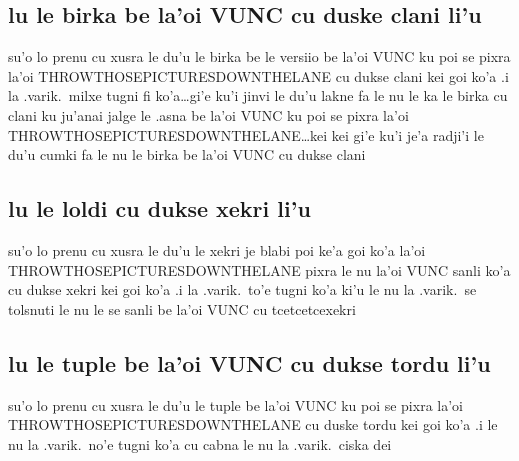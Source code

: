 \documentclass{report}
\begin{document}
\subsection{lu le birka be la'oi VUNC cu duske clani li'u}
su'o lo prenu cu xusra le du'u le birka be le versiio be la'oi VUNC ku poi se pixra la'oi THROWTHOSEPICTURESDOWNTHELANE cu dukse clani kei goi ko'a  .i la .varik.\ milxe tugni fi ko'a\ldots gi'e ku'i jinvi le du'u lakne fa le nu le ka le birka cu clani ku ju'anai jalge le .asna be la'oi VUNC ku poi se pixra la'oi THROWTHOSEPICTURESDOWNTHELANE\ldots kei kei gi'e ku'i je'a radji'i le du'u cumki fa le nu le birka be la'oi VUNC cu dukse clani

\subsection{lu le loldi cu dukse xekri li'u}
su'o lo prenu cu xusra le du'u le xekri je blabi poi ke'a goi ko'a la'oi THROWTHOSEPICTURESDOWNTHELANE pixra le nu la'oi VUNC sanli ko'a cu dukse xekri kei goi ko'a  .i la .varik.\ to'e tugni ko'a ki'u le nu la .varik.\ se tolsnuti le nu le se sanli be la'oi VUNC cu tcetcetcexekri

\subsection{lu le tuple be la'oi VUNC cu dukse tordu li'u}
su'o lo prenu cu xusra le du'u le tuple be la'oi VUNC ku poi se pixra la'oi THROWTHOSEPICTURESDOWNTHELANE cu duske tordu kei goi ko'a  .i le nu la .varik.\ no'e tugni ko'a cu cabna le nu la .varik.\ ciska dei
\end{document}
